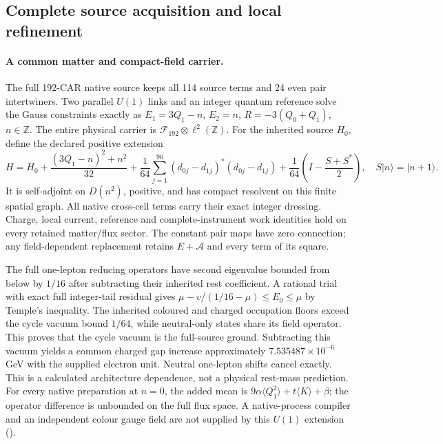 \subsection{Complete source acquisition and local refinement}

\paragraph{A common matter and compact-field carrier.}
The full 192-CAR native source keeps all 114 source terms and 24 even pair
intertwiners. Two parallel $U(1)$ links and an integer quantum reference
solve the Gauss constraints exactly as
$E_1=3Q_1-n$, $E_2=n$, $R=-3(Q_0+Q_1)$, $n\in\mathbb Z$.
The entire physical carrier is $\mathcal F_{192}\otimes\ell^2(\mathbb Z)$.
For the inherited source $H_0$, define the declared positive extension
\[
 H=H_0+\frac{(3Q_1-n)^2+n^2}{32}
 +\frac1{64}\sum_{j=1}^{96}(d_{0j}-d_{1j})^*(d_{0j}-d_{1j})
 +\frac1{64}\left(I-\frac{S+S^*}{2}\right),\quad S|n\rangle=|n+1\rangle.
\]
It is self-adjoint on $D(n^2)$, positive, and has compact resolvent on
this finite spatial graph. All native cross-cell terms carry their exact
integer dressing. Charge, local current, reference and complete-instrument
work identities hold on every retained matter/flux sector. The constant
pair maps have zero connection; any field-dependent replacement retains
$E+\mathcal A$ and every term of its square.

The full one-lepton reducing operators have second eigenvalue bounded
from below by $1/16$ after subtracting their inherited rest coefficient.
A rational trial with exact full integer-tail residual gives
$\mu-v/(1/16-\mu)\le E_0\le\mu$ by Temple's inequality.
The inherited coloured and charged occupation floors exceed the cycle
vacuum bound $1/64$, while neutral-only states share its field operator.
This proves that the cycle vacuum is the full-source ground.
Subtracting this vacuum yields a common charged gap increase
approximately $7.535487\times10^{-6}$ GeV with the supplied electron unit.
Neutral one-lepton shifts cancel exactly. This is a calculated architecture
dependence, not a physical rest-mass prediction. For every native
preparation at $n=0$, the added mean is
$9\alpha\langle Q_1^2\rangle+t\langle K\rangle+\beta$; the operator
difference is unbounded on the full flux space. A native-process compiler
and an independent colour gauge field are not supplied by this $U(1)$
extension ().

